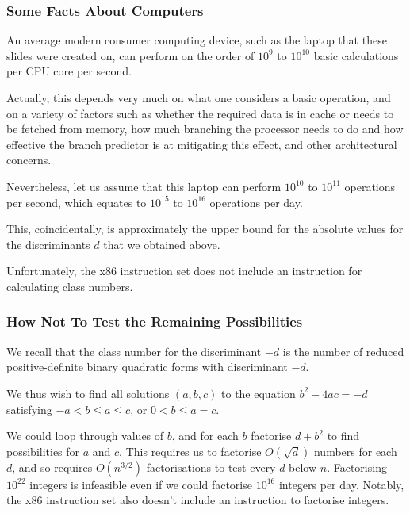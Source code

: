 \documentclass[handout]{beamer}
\begin{document}
\begin{frame}

	\frametitle{Some Facts About Computers}

	An average modern consumer computing device, such as the laptop that these slides were created on, can perform on the order of $10^9$ to $10^{10}$ basic calculations per CPU core per second. \pause

	Actually, this depends very much on what one considers a basic operation, and on a variety of factors such as whether the required data is in cache or needs to be fetched from memory, how much branching the processor needs to do and how effective the branch predictor is at mitigating this effect, and other architectural concerns. \pause

	Nevertheless, let us assume that this laptop can perform $10^{10}$ to $10^{11}$ operations per second, which equates to $10^{15}$ to $10^{16}$ operations per day. \pause

	This, coincidentally, is approximately the upper bound for the absolute values for the discriminants $d$ that we obtained above. \pause

	Unfortunately, the x86 instruction set does not include an instruction for calculating class numbers.

	
\end{frame}

\begin{frame}

	\frametitle{How Not To Test the Remaining Possibilities}

	We recall that the class number for the discriminant $-d$ is the number of reduced positive-definite binary quadratic forms with discriminant $-d$. \pause

	We thus wish to find all solutions $(a, b, c)$ to the equation $b^2 - 4ac = -d$ satisfying $-a < b \leq a \leq c$, or $0 < b \leq a = c$. \pause

	We could loop through values of $b$, and for each $b$ factorise $d + b^2$ to find possibilities for $a$ and $c$. This requires us to factorise $O(\sqrt{d})$ numbers for each $d$, and so requires $O(n^{3/2})$ factorisations to test every $d$ below $n$. Factorising $10^{22}$ integers is infeasible even if we could factorise $10^{16}$ integers per day. Notably, the x86 instruction set also doesn't include an instruction to factorise integers. \pause

\end{frame}
\end{document}
